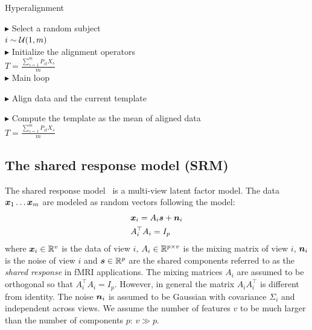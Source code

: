 \begin{algorithm}[H]
  \SetAlgoLined
  \caption{Hyperalignment}
  \label{algo:hyperalignment}
  $\blacktriangleright$ Select a random subject \\
  $i \sim \mathcal{U}(1, m)$ \\
  $\blacktriangleright$ Initialize the alignment operators \\
  $T = \frac{\sum_{s=1}^m P_{st} X_s}{m}$ \\

  $\blacktriangleright$ Main loop \\
  {
    $\blacktriangleright$ Align data and the current template \\

    $\blacktriangleright$ Compute the template as the mean of aligned data \\
    $T = \frac{\sum_{s=1}^m P_{st} X_s}{m}$ \\
    }
\end{algorithm}



\subsection{The shared response model (SRM)}
\label{sec:srm:review}
The shared response model~\cite{chen2015reduced} is a multi-view latent factor
model. The data $\boldsymbol{x}_1 \dots \boldsymbol{x}_m$ are modeled as random vectors following the model:
\begin{align}
 &\boldsymbol{x}_i = A_i \boldsymbol{s} + \boldsymbol{n}_i \\
  &A_i^{\top}A_i = I_p
  \label{eq:model:srm}
\end{align}
where $\boldsymbol{x}_i \in \mathbb{R}^v$ is the data of view $i$, $A_i \in \mathbb{R}^{p \times v}$ is the
mixing matrix of view $i$, $\boldsymbol{n}_i$ is the noise of view $i$ and $\boldsymbol{s} \in \mathbb{R}^p$ are the
shared components referred to as the \emph{shared response} in fMRI applications.
The mixing matrices
$A_i$ are assumed to be orthogonal so that $A_i^{\top}A_i = I_p$. However, in
general the matrix $A_i A_i^{\top}$ is different from identity. The noise
$\boldsymbol{n}_i$ is assumed to be Gaussian with covariance $\Sigma_i$ and independent
across views. We assume the number of features $v$ to be much larger than the
number of components $p$: $v \gg p$.

